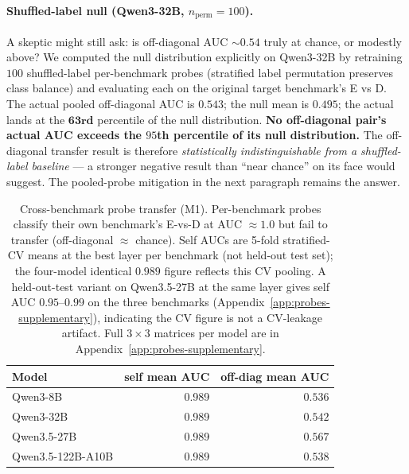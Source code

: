 \documentclass[11pt]{article}
\begin{document}
\paragraph{Shuffled-label null (Qwen3-32B, $n_{\text{perm}}{=}100$).}
A skeptic might still ask: is off-diagonal AUC $\sim$$0.54$ truly at
chance, or modestly above? We computed the null distribution explicitly
on Qwen3-32B by retraining $100$ shuffled-label per-benchmark probes
(stratified label permutation preserves class balance) and evaluating
each on the original target benchmark's E vs D. The actual pooled
off-diagonal AUC is $\bm{0.543}$; the null mean is $\bm{0.495}$; the
actual lands at the $\bm{63\text{rd}}$ percentile of the null
distribution. \textbf{No off-diagonal pair's actual AUC exceeds the
$95$th percentile of its null distribution.} The off-diagonal transfer
result is therefore \emph{statistically indistinguishable from a
shuffled-label baseline} --- a stronger negative result than ``near
chance'' on its face would suggest. The pooled-probe mitigation in the
next paragraph remains the answer.

\begin{table}[t]
\centering\small
\setlength{\tabcolsep}{3pt}
\begin{tabular}{lrr}
\toprule
Model & self mean AUC & off-diag mean AUC \\
\midrule
Qwen3-8B            & 0.989 & $\bm{0.536}$ \\
Qwen3-32B           & 0.989 & $\bm{0.542}$ \\
Qwen3.5-27B         & 0.989 & $\bm{0.567}$ \\
Qwen3.5-122B-A10B   & 0.989 & $\bm{0.538}$ \\
\bottomrule
\end{tabular}
\caption{Cross-benchmark probe transfer (M1). Per-benchmark probes
classify their own benchmark's E-vs-D at AUC $\approx 1.0$ but fail to
transfer (off-diagonal $\approx$ chance). Self AUCs are 5-fold
stratified-CV means at the best layer per benchmark (not held-out test
set); the four-model identical $0.989$ figure reflects this CV pooling.
A held-out-test variant on Qwen3.5-27B at the same layer gives self
AUC $0.95$--$0.99$ on the three benchmarks (Appendix~\ref{app:probes-supplementary}),
indicating the CV figure is not a CV-leakage artifact. Full $3\times 3$
matrices per model are in Appendix~\ref{app:probes-supplementary}.}
\label{tab:probe-transfer}
\end{table}
\end{document}
